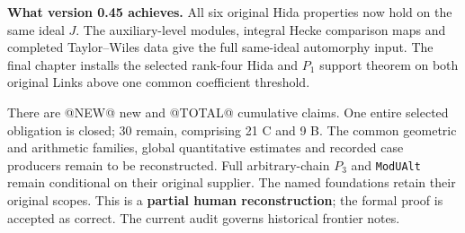 \textbf{What version 0.45 achieves.}
All six original Hida properties now hold on the same ideal $J$.
The auxiliary-level modules, integral Hecke comparison maps and
completed Taylor--Wiles data give the full same-ideal automorphy
input.  The final chapter installs the selected rank-four Hida
and $P_1$ support theorem on both original Links above one common
coefficient threshold.

There are @NEW@ new and @TOTAL@ cumulative claims.  One entire
selected obligation is closed; 30 remain, comprising 21 C and 9 B.
The common geometric and arithmetic families, global quantitative
estimates and recorded case producers remain to be reconstructed.
Full arbitrary-chain $P_3$ and \texttt{ModUAlt} remain conditional
on their original supplier.  The named foundations retain their
original scopes.
This is a \textbf{partial human reconstruction}; the formal proof
is accepted as correct.  The current audit governs historical
frontier notes.

